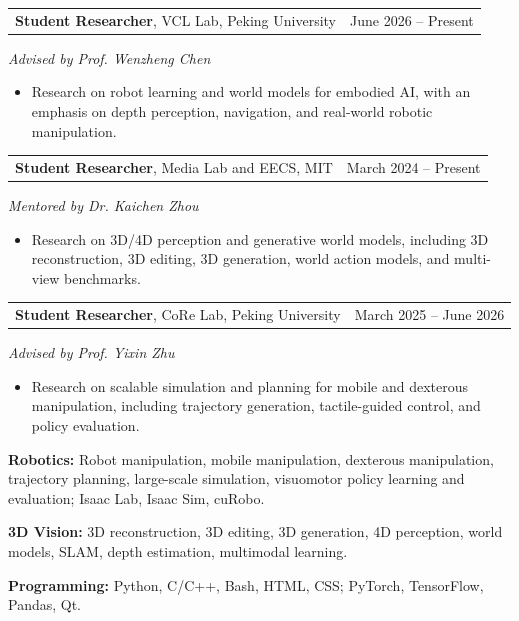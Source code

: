 \documentclass[10pt, letterpaper]{article}
\makeatletter
\newlength{\cvcontentoffset}
\newif\ifcvfirstsection
\newif\ifshowsectiondividers
\newcommand{\cvdivider}{%
    \par\vspace{0.17cm}%
    \noindent\hspace*{\cvcontentoffset}%
    \makebox[\dimexpr\linewidth-\cvcontentoffset\relax][l]{%
        \ifshowsectiondividers
            {\color{dividerColor}\xleaders\hbox{\rule{4pt}{0.35pt}\hspace{3pt}}\hfill\kern0pt}%
        \else
            \rule{0pt}{0.35pt}%
        \fi
    }%
    \par\vspace{0.15cm}%
}
\newcommand{\cvsection}[2]{%
    \ifcvfirstsection
        \global\cvfirstsectionfalse
        \vspace{0.24cm}
    \else
        \cvdivider
    \fi
    \begin{cvblocks}
        \item[#1] #2
    \end{cvblocks}
}
\newcommand{\datedline}[2]{%
    \noindent
    \begin{tabularx}{\linewidth}{@{}X@{\hspace{0.45cm}}r@{}}
        #1 & #2
    \end{tabularx}\par
}
\newcommand{\entrygap}{\vspace{0.18cm}}
\newenvironment{compactitems}{%
    \begin{itemize}[leftmargin=1.15em, topsep=0.04cm, itemsep=0pt, parsep=0pt, partopsep=0pt]
}{%
    \end{itemize}
}
\makeatother
\begin{document}
\cvsection{Research\\Experience}{
    \datedline{\textbf{Student Researcher}, VCL Lab, Peking University}{June 2026 -- Present}
    \textit{Advised by Prof. Wenzheng Chen}
    \begin{compactitems}
        \item Research on robot learning and world models for embodied AI, with an emphasis on depth perception, navigation, and real-world robotic manipulation.
    \end{compactitems}

    \entrygap
    \datedline{\textbf{Student Researcher}, Media Lab and EECS, MIT}{March 2024 -- Present}
    \textit{Mentored by Dr. Kaichen Zhou}
    \begin{compactitems}
        \item Research on 3D/4D perception and generative world models, including 3D reconstruction, 3D editing, 3D generation, world action models, and multi-view benchmarks.
    \end{compactitems}

    \entrygap
    \datedline{\textbf{Student Researcher}, CoRe Lab, Peking University}{March 2025 -- June 2026}
    \textit{Advised by Prof. Yixin Zhu}
    \begin{compactitems}
        \item Research on scalable simulation and planning for mobile and dexterous manipulation, including trajectory generation, tactile-guided control, and policy evaluation.
    \end{compactitems}
}

\cvsection{Technical\\Skills}{
    \textbf{Robotics:} Robot manipulation, mobile manipulation, dexterous manipulation, trajectory planning, large-scale simulation, visuomotor policy learning and evaluation; Isaac Lab, Isaac Sim, cuRobo.\par
    \textbf{3D Vision:} 3D reconstruction, 3D editing, 3D generation, 4D perception, world models, SLAM, depth estimation, multimodal learning.\par
    \textbf{Programming:} Python, C/C++, Bash, HTML, CSS; PyTorch, TensorFlow, Pandas, Qt.
}
\end{document}
